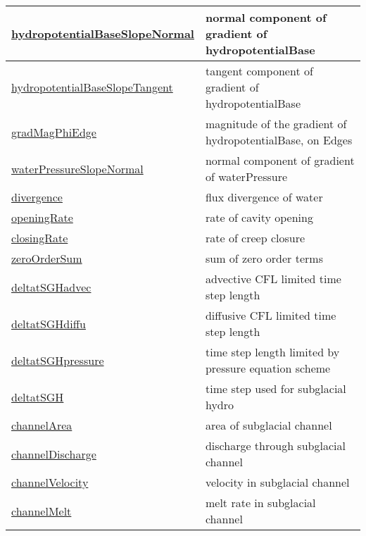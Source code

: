 {\begin{center}
\begin{longtable}{| p{2.0in} | p{4.0in} |}
    \hyperref[subsec:var_sec_hydro_hydropotentialBaseSlopeNormal]{hydropotentialBaseSlopeNormal} & normal component of gradient of hydropotentialBase \\
    \hline
    \hyperref[subsec:var_sec_hydro_hydropotentialBaseSlopeTangent]{hydropotentialBaseSlopeTangent} & tangent component of gradient of hydropotentialBase \\
    \hline
    \hyperref[subsec:var_sec_hydro_gradMagPhiEdge]{gradMagPhiEdge} & magnitude of the gradient of hydropotentialBase, on Edges \\
    \hline
    \hyperref[subsec:var_sec_hydro_waterPressureSlopeNormal]{waterPressureSlopeNormal} & normal component of gradient of waterPressure \\
    \hline
    \hyperref[subsec:var_sec_hydro_divergence]{divergence} & flux divergence of water \\
    \hline
    \hyperref[subsec:var_sec_hydro_openingRate]{openingRate} & rate of cavity opening \\
    \hline
    \hyperref[subsec:var_sec_hydro_closingRate]{closingRate} & rate of creep closure \\
    \hline
    \hyperref[subsec:var_sec_hydro_zeroOrderSum]{zeroOrderSum} & sum of zero order terms \\
    \hline
    \hyperref[subsec:var_sec_hydro_deltatSGHadvec]{deltatSGHadvec} & advective CFL limited time step length \\
    \hline
    \hyperref[subsec:var_sec_hydro_deltatSGHdiffu]{deltatSGHdiffu} & diffusive CFL limited time step length \\
    \hline
    \hyperref[subsec:var_sec_hydro_deltatSGHpressure]{deltatSGHpressure} & time step length limited by pressure equation scheme \\
    \hline
    \hyperref[subsec:var_sec_hydro_deltatSGH]{deltatSGH} & time step used for subglacial hydro \\
    \hline
    \hyperref[subsec:var_sec_hydro_channelArea]{channelArea} & area of subglacial channel \\
    \hline
    \hyperref[subsec:var_sec_hydro_channelDischarge]{channelDischarge} & discharge through subglacial channel \\
    \hline
    \hyperref[subsec:var_sec_hydro_channelVelocity]{channelVelocity} & velocity in subglacial channel \\
    \hline
    \hyperref[subsec:var_sec_hydro_channelMelt]{channelMelt} & melt rate in subglacial channel \\

\end{longtable}
\end{center}}
